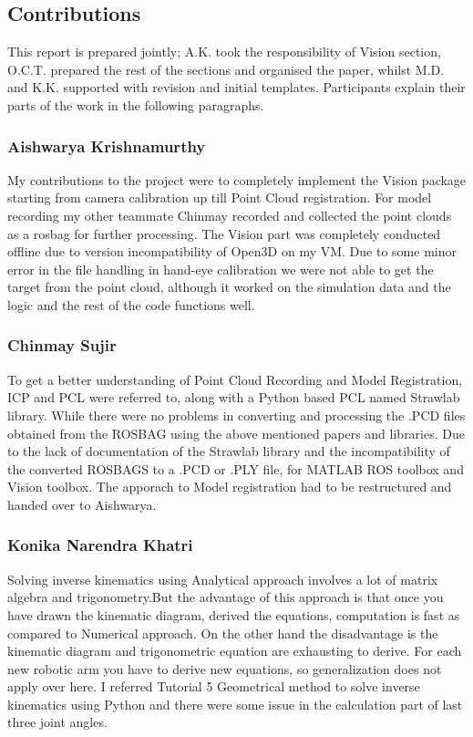\subsection{Contributions}
This report is prepared jointly;
A.K. took the responsibility of Vision section, O.C.T. prepared the rest of the sections and organised the paper, whilst M.D. and K.K. supported with revision and initial templates. Participants explain their parts of the work in the following paragraphs.

\subsubsection{Aishwarya Krishnamurthy} My contributions to the project were to completely implement the Vision package starting from camera calibration up till Point Cloud registration. For model recording  my other teammate Chinmay recorded and collected the point clouds as a rosbag for further processing. The Vision part was completely conducted offline due to version incompatibility of Open3D on my VM. Due to some minor error in the file handling in hand-eye calibration we were not able to get the target from the point cloud, although it worked on the simulation data and the logic and the rest of the code functions well.

\subsubsection{Chinmay Sujir} To get a better understanding of Point Cloud Recording and  Model Registration, ICP and PCL were referred to, along with a Python based PCL named Strawlab library.
While there were no problems in converting and processing  the .PCD files obtained from the ROSBAG using the above mentioned papers and libraries.
Due to the lack of documentation of the Strawlab library and the incompatibility of the converted  ROSBAGS to a .PCD or  .PLY file, for MATLAB ROS toolbox and Vision toolbox. The apporach to Model registration had to be restructured and handed over to  Aishwarya.

\subsubsection{Konika Narendra Khatri } Solving inverse kinematics using Analytical approach involves a lot of matrix algebra and trigonometry.But the advantage of this approach is that once you have drawn the kinematic diagram, derived the equations, computation is fast as compared to Numerical approach. On the other hand the disadvantage is the kinematic diagram and trigonometric equation are exhausting to derive. For each new robotic arm you have to derive new equations, so generalization does not apply over here. I referred Tutorial 5 Geometrical method to solve inverse kinematics using Python and there were some issue in the calculation part of last three joint angles.

